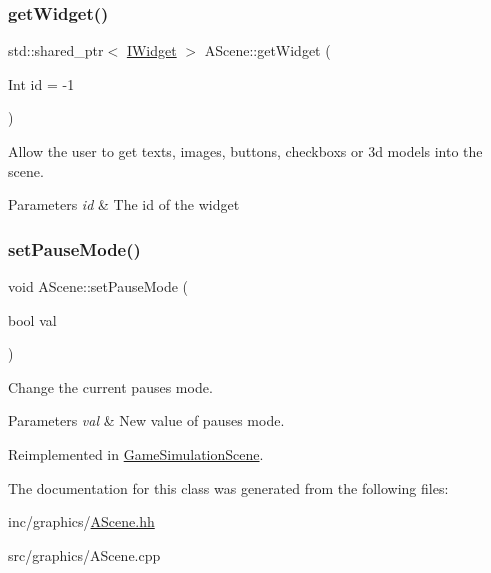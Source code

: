 \mbox{\label{classAScene_a04796ae4f8cfdf49f7e3295c29fc97cc}} 
\subsubsection{\texorpdfstring{get\+Widget()}{getWidget()}}
{\footnotesize\ttfamily std\+::shared\+\_\+ptr$<$ \hyperlink{classIWidget}{I\+Widget} $>$ A\+Scene\+::get\+Widget (\begin{DoxyParamCaption}\item[{Int}]{id = {\ttfamily -\/1} }\end{DoxyParamCaption})}



Allow the user to get texts, images, buttons, checkboxs or 3d models into the scene. 


\begin{DoxyParams}{Parameters}
{\em id} & The id of the widget \\
\hline
\end{DoxyParams}
\mbox{\label{classAScene_a7ff45d7a24796f52d815c00770900339}} 
\subsubsection{\texorpdfstring{set\+Pause\+Mode()}{setPauseMode()}}
{\footnotesize\ttfamily void A\+Scene\+::set\+Pause\+Mode (\begin{DoxyParamCaption}\item[{bool}]{val }\end{DoxyParamCaption})\hspace{0.3cm}{\ttfamily [virtual]}}



Change the current pause\textquotesingle{}s mode. 


\begin{DoxyParams}{Parameters}
{\em val} & New value of pause\textquotesingle{}s mode. \\
\hline
\end{DoxyParams}


Reimplemented in \hyperlink{classGameSimulationScene_a34377bab69b7a81e50f3d2c42596c574}{Game\+Simulation\+Scene}.



The documentation for this class was generated from the following files\+:\begin{DoxyCompactItemize}
\item 
inc/graphics/\hyperlink{AScene_8hh}{A\+Scene.\+hh}\item 
src/graphics/A\+Scene.\+cpp\end{DoxyCompactItemize}
